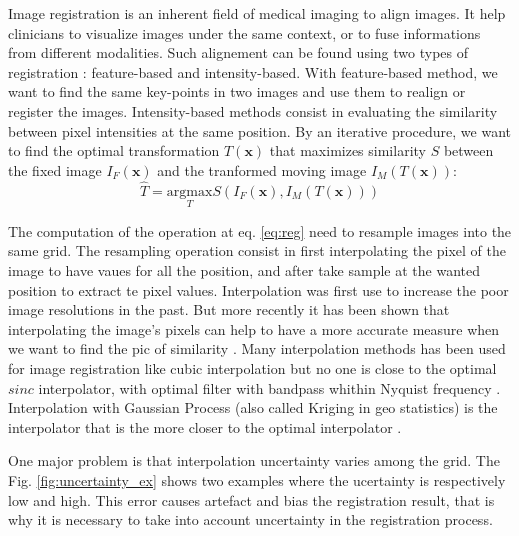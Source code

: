 \documentclass[10pt,twocolumn,letterpaper]{article}
\begin{document}
Image registration is an inherent field of medical imaging to align images. It help clinicians to visualize images under the same context, or to fuse informations from different modalities.
Such alignement can be found using two types of registration : feature-based and intensity-based. With feature-based method, we want to find the same key-points in two images and use them to realign or register the images. Intensity-based methods consist in evaluating the similarity between pixel intensities at the same position. By an iterative procedure, we want to find the optimal transformation $T(\mathbf{x})$ that maximizes similarity $S$ between the fixed image $I_F(\mathbf{x})$ and the tranformed moving image $I_M(T(\mathbf{x}))$:
\begin{equation}
\hat{T}=\underset{T}{\textrm{argmax}}  S(I_F(\mathbf{x}),I_M(T(\mathbf{x}))) 
\end{equation}\label{eq:reg}
\par
The computation of the operation at eq. \ref{eq:reg} need to resample images into the same grid. The resampling operation consist in first interpolating the pixel of the image to have vaues for all the position, and after take sample at the wanted position to extract te pixel values.
Interpolation was first use to increase the poor image resolutions in the past. But more recently it has been shown that interpolating the image's pixels can help to have a more accurate measure when we want to find the pic of similarity \cite{hill2001medical}. Many interpolation methods has been used for image registration like cubic interpolation \cite{hou1978cubic} but no one is close to the optimal $sinc$ interpolator, with optimal filter with bandpass whithin Nyquist frequency \cite{thevenaz2000image}. Interpolation with Gaussian Process (also called Kriging in geo statistics) is the interpolator that is the more closer to the optimal interpolator \cite{stytz1993using}.\par
One major problem is that interpolation uncertainty varies among the grid. The Fig. \ref{fig:uncertainty_ex} shows two examples where the ucertainty is respectively low and high. This error causes artefact \cite{aljabar2005interpolation} and bias the registration result, that is why it is necessary to take into account uncertainty in the registration process.
\end{document}
